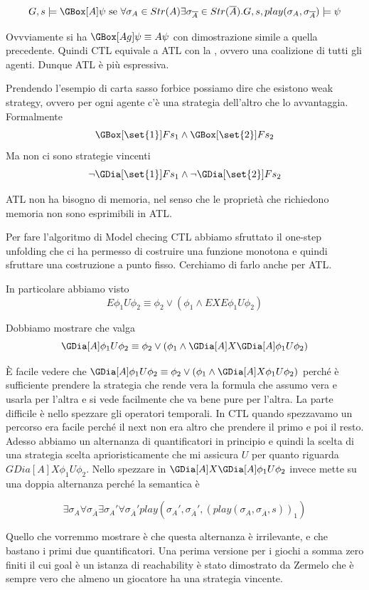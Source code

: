 \[G,s\models \GBox[A] \psi \text{ se } \forall \sigma_A \in Str(A) \exists \sigma_{\overline{A}} \in Str(\overline{A}). G,s,play(\sigma_A,\sigma_{\overline{A}})\models \psi \]

Ovvviamente si ha \(\GBox[Ag] \psi \equiv A\psi\) con dimostrazione simile a quella precedente. Quindi CTL equivale a ATL con la , ovvero una coalizione di tutti gli agenti. Dunque ATL è più espressiva.

Prendendo l'esempio di carta sasso forbice possiamo dire che esistono weak strategy, ovvero per ogni agente c'è una strategia dell'altro che lo avvantaggia. Formalmente
\[\GBox[\set{1}] F s_1\land \GBox[\set{2}] F s_2\]
Ma non ci sono strategie vincenti
\[\neg \GDia[\set{1}] F s_1 \land \neg \GDia[\set{2}] F s_2\]

ATL non ha bisogno di memoria, nel senso che le proprietà che richiedono memoria non sono esprimibili in ATL.

Per fare l'algoritmo di Model checing CTL abbiamo sfruttato il one-step unfolding che ci ha permesso di costruire una funzione monotona e quindi sfruttare una costruzione a punto fisso. Cerchiamo di farlo anche per ATL.

In particolare abbiamo visto
\[E \phi_1 U\phi_2 \equiv \phi_2 \lor (\phi_1\land E X E \phi_1 U\phi_2)\]

Dobbiamo mostrare che valga
\[\GDia[A] \phi_1 U\phi_2 \equiv \phi_2 \lor (\phi_1\land \GDia[A] X \GDia[A] \phi_1 U\phi_2)\]

È facile vedere che \(\GDia[A] \phi_1 U\phi_2 \equiv \phi_2 \lor (\phi_1\land \GDia[A] X \phi_1 U\phi_2)\) perché è sufficiente prendere la strategia che rende vera la formula che assumo vera e usarla per l'altra e si vede facilmente che va bene pure per l'altra. La parte difficile è nello spezzare gli operatori temporali. In CTL quando spezzavamo un percorso era facile perché il next non era altro che prendere il primo e poi il resto. Adesso abbiamo un alternanza di quantificatori in principio e quindi la scelta di una strategia scelta aprioristicamente che mi assicura \(U\) per quanto riguarda \(GDia[A] X \phi_1 U\phi_2\). Nello spezzare in \(\GDia[A] X \GDia[A] \phi_1 U\phi_2\) invece mette su una doppia alternanza perché la semantica è

\[\exists \sigma_A \forall \sigma_{\overline{A}} \exists \sigma_{A}' \forall \sigma_{\overline{A}}' play(\sigma_{A}',\sigma_{\overline{A}}',{\left(play(\sigma_A,\sigma_{\overline{A}},s)\right)}_1) \]

Quello che vorremmo mostrare è che questa alternanza è irrilevante, e che bastano i primi due quantificatori. Una perima versione per i giochi a somma zero finiti il cui goal è un istanza di reachability è stato dimostrato da Zermelo che è sempre vero che almeno un giocatore ha una strategia vincente.

